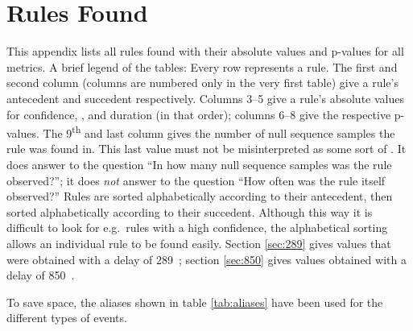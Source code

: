 
\newcommand{\tf}{\addfontfeatures{Numbers={Monospaced,Lining}}}	%
\newcommand{\ts}{~~}											%
\newcommand{\tu}[1]{\multicolumn{1}{c}{\textit{#1}}}		%

\renewcommand{\mosp}{\mbox{mo\_speech}}
\renewcommand{\mogain}{\mbox{mo\_gaze\_in}}
\renewcommand{\mogaob}{\mbox{mo\_gaze\_obj}}
\renewcommand{\mogaaw}{\mbox{mo\_gaze\_away}}
\renewcommand{\mosm}{\mbox{mo\_smile}}
\renewcommand{\invo}{\mbox{in\_voc}}
\renewcommand{\ingamo}{\mbox{in\_gaze\_mo}}
\renewcommand{\ingaob}{\mbox{in\_gaze\_obj}}
\renewcommand{\ingaaw}{\mbox{in\_gaze\_away}}
\renewcommand{\insm}{\mbox{in\_sm}}


\chapter{Rules Found}
\label{ch:app_rules}
This appendix lists all rules found with their absolute values and p-values for all metrics.
A brief legend of the tables: Every row represents a rule.
The first and second column (columns are numbered only in the very first table) give a rule's antecedent and succedent respectively.
Columns 3--5 give a rule's absolute values for confidence, \noc, and duration (in that order); columns 6--8 give the respective p-values.
The 9\textsuperscript{th} and last column gives the number of null sequence samples the rule was found in.
This last value must not be misinterpreted as some sort of \noc.
It does answer to the question ``In how many null sequence samples was the rule observed?''; it does \emph{not} answer to the question ``How often was the rule itself observed?''
Rules are sorted alphabetically according to their antecedent, then sorted alphabetically according to their succedent.
Although this way it is difficult to look for e.g.~rules with a high confidence, the alphabetical sorting allows an individual rule to be found easily.
Section \ref{sec:289} gives values that were obtained with a delay of 289~\ms; section \ref{sec:850} gives values obtained with a delay of 850~\ms.

To save space, the aliases shown in table \ref{tab:aliases} have been used for the different types of events.

